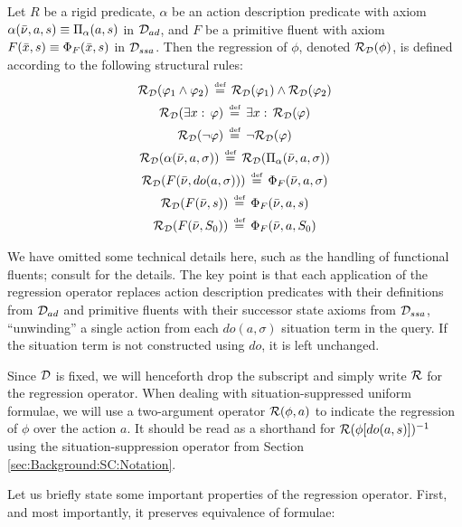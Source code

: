 \begin{defnL}
 Let $R$ be a rigid predicate, $\alpha$
be an action description predicate with axiom $\alpha(\bar{\nu},a,s)\equiv\Pi_{\alpha}(a,s)$
in $\mathcal{D}_{ad}$, and $F$ be a primitive fluent with axiom $F(\bar{x},s)\equiv\Phi_{F}(\bar{x},s)$
in $\mathcal{D}_{ssa}$. Then the regression of $\phi$, denoted $\mathcal{R}_{\mathcal{D}}(\phi)$,
is defined according to the following structural rules:\begin{gather*}
\mathcal{R}_{\mathcal{D}}(\varphi_{1}\wedge\varphi_{2})\,\stackrel{\mbox{\tiny def}}{=}\,\mathcal{R}_{\mathcal{D}}(\varphi_{1})\wedge\mathcal{R}_{\mathcal{D}}(\varphi_{2})\\
\mathcal{R}_{\mathcal{D}}(\exists x:\,\varphi)\,\stackrel{\mbox{\tiny def}}{=}\,\exists x:\,\mathcal{R}_{\mathcal{D}}(\varphi)\\
\mathcal{R}_{\mathcal{D}}(\neg\varphi)\,\stackrel{\mbox{\tiny def}}{=}\,\neg\mathcal{R}_{\mathcal{D}}(\varphi)\\
\mathcal{R}_{\mathcal{D}}(\alpha(\bar{\nu},a,\sigma))\,\stackrel{\mbox{\tiny def}}{=}\,\mathcal{R}_{\mathcal{D}}(\Pi_{\alpha}(\bar{\nu},a,\sigma))\\
\mathcal{R}_{\mathcal{D}}(F(\bar{\nu},do(a,\sigma)))\,\stackrel{\mbox{\tiny def}}{=}\,\Phi_{F}(\bar{\nu},a,\sigma)\\
\mathcal{R}_{\mathcal{D}}(F(\bar{\nu},s))\,\stackrel{\mbox{\tiny def}}{=}\,\Phi_{F}(\bar{\nu},a,s)\\
\mathcal{R}_{\mathcal{D}}(F(\bar{\nu},S_{0}))\,\stackrel{\mbox{\tiny def}}{=}\,\Phi_{F}(\bar{\nu},a,S_{0})\end{gather*}

\end{defnL}
We have omitted some technical details here, such as the handling
of functional fluents; consult \citep{pirri99contributions_sitcalc}
for the details. The key point is that each application of the regression
operator replaces action description predicates with their definitions
from $\mathcal{D}_{ad}$ and primitive fluents with their successor state
axioms from $\mathcal{D}_{ssa}$, {}``unwinding'' a single action from each
$do(a,\sigma)$ situation term in the query. If the situation term
is not constructed using $do$, it is left unchanged.

Since $\mathcal{D}$ is fixed, we will henceforth drop the subscript and simply
write $\mathcal{R}$ for the regression operator. When dealing with situation-suppressed
uniform formulae, we will use a two-argument operator $\mathcal{R}(\phi,a)$
to indicate the regression of $\phi$ over the action $a$. It should
be read as a shorthand for $\mathcal{R}(\phi[do(a,s)])^{-1}$ using the situation-suppression
operator from Section \ref{sec:Background:SC:Notation}.

Let us briefly state some important properties of the regression operator.
First, and most importantly, it preserves equivalence of formulae:

